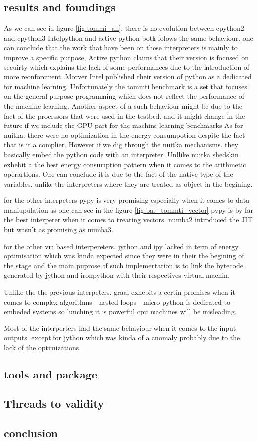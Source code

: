 \subsection{results and foundings}
As we can see in figure \ref{fig:tommi_all}, there is no evolution between cpython2 and cpython3
Intelpython and active python both folows the same behaviour. one can conclude that the work that have been on those interpreters is mainly
to improve a specific purpose, Active python claims that their version is focused on secuirty which explains the lack of some performances due to the introduction of more reonforcment
.Morver Intel published their version of python as a dedicated for machine learning. Unfortunately the tommti benchmark is a set that focuses on the general purpose programming
which does not reflect the performance of the machine learning.
Another aspect of a such behaviour might be due to the fact of the processors that were used in the testbed. and it might change in the future if we include the GPU part for the machine learning benchmarks
As for nuitka. there were no optimization in the energy consumpotion despite the fact that is it a complier.
However if we dig through the nuitka mechanisms. they basically embed the python code with an interpreter.
Unllike nuitka shedskin exhebit a the best energy consumption pattern when it comes to the arithmetic operartions. One can conclude it is due to the fact of the native type of the variables. unlike the interpreters where they are treated as object in the begining.

for the other interpeters pypy is very promising especially when it comes to data maniupulation as one can see in the figure \ref{fig:bar_tommti_vector}
pypy is by far the best interperer when it comes to treating vectors.
numba2 introduced the JIT but wasn't as promising as numba3.

for the other vm based interpereters. jython and ipy lacked in term of energy optimisation which was kinda expected since they were in their the begining of the stage and the main puprose of such implementation is to link the bytecode generated by jython and ironpython with their respectives virtual machin.

Unlike the the previous interpeters. graal exhebits a certin promises when it comes to complex algorithms - nested loops -
micro python is dedicated to embeded systems so lunching it is powerful cpu machines will be misleading.

Most of the interperters had the same behaviour when it comes to the input outputs. except for jython which was kinda of a anomaly probably due to the lack of the optimizations.




\subsection{tools and package}

\subsection{Threads to validity}

\subsection{conclusion}

